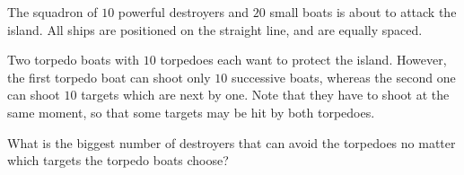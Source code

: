 The squadron of $10$ powerful destroyers and $20$ small boats is about to attack the island. All ships are positioned on the straight line, and are equally spaced.

Two torpedo boats with $10$ torpedoes each want to protect the island. However, the first torpedo boat can shoot only $10$ successive boats, whereas the second one can shoot $10$ targets which are next by one. Note that they have to shoot at the same moment, so that some targets may be hit by both torpedoes.

What is the biggest number of destroyers that can avoid the torpedoes no matter which targets the torpedo boats choose?